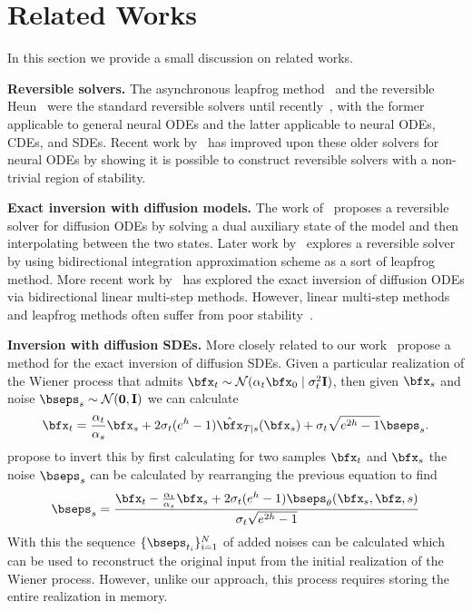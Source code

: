 \section{Related Works}
In this section we provide a small discussion on related works.

\textbf{Reversible solvers.} The asynchronous leapfrog method~\citep{zhuang2021mali} and the reversible Heun~\citep{kidger2021efficient} were the standard reversible solvers until recently~\citep[\cf][]{mccallum2024efficient}, with the former applicable to general neural ODEs and the latter applicable to neural ODEs, CDEs, and SDEs.
Recent work by~\citet{mccallum2024efficient} has improved upon these older solvers for neural ODEs by showing it is possible to construct reversible solvers with a non-trivial region of stability.

\textbf{Exact inversion with diffusion models.}
The work of~\citet{wallace2023edict} proposes a reversible solver for diffusion ODEs by solving a dual auxiliary state of the model and then interpolating between the two states.
Later work by~\citet{zhang2023bdia} explores a reversible solver by using bidirectional integration approximation scheme as a sort of leapfrog method.
More recent work by~\citet{wang2024belm} has explored the exact inversion of diffusion ODEs via bidirectional linear multi-step methods.
However, linear multi-step methods and leapfrog methods often suffer from poor stability~\citep{shampine2009stability}.


\textbf{Inversion with diffusion SDEs.}
More closely related to our work~\citet{wu2022unifying} propose a method for the exact inversion of diffusion SDEs.
Given a particular realization of the Wiener process that admits $\bfx_t \sim \mathcal{N}(\alpha_t \bfx_0 \mid \sigma_t^2\mathbf{I})$, then given $\bfx_s$ and noise $\bseps_s \sim \mathcal{N}(\mathbf0, \mathbf I)$ we can calculate
\begin{equation}
    \bfx_t = \frac{\alpha_t}{\alpha_s} \bfx_s + 2\sigma_t(e^h-1)\hat\bfx_{T|s}(\bfx_s) + \sigma_t\sqrt{e^{2h}-1}\bseps_s.
\end{equation}
\citet{wu2022unifying} propose to invert this by first calculating for two samples $\bfx_t$ and $\bfx_s$ the noise $\bseps_s$ can be calculated by rearranging the previous equation to find
\begin{equation}
    \bseps_s = \frac{\bfx_t - \frac{\alpha_t}{\alpha_s}\bfx_s + 2 \sigma_t (e^h - 1) \bseps_\theta(\bfx_s, \bfz, s)}{\sigma_t \sqrt{e^{2h} - 1}}
\end{equation}
With this the sequence $\{\bseps_{t_i}\}_{i=1}^N$ of added noises can be calculated which can be used to reconstruct the original input from the initial realization of the Wiener process.
However, unlike our approach, this process requires storing the entire realization in memory.